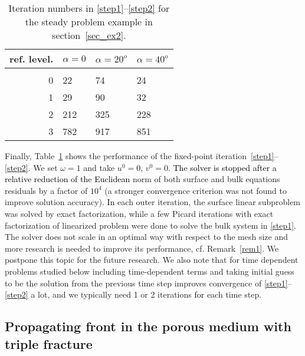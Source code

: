 \documentclass{article}
\newcommand{\rev}[1]{\textcolor{black}{{#1}}}
\begin{document}
\begin{table}[h!]   {
\begin{center}
\caption{Iteration numbers in \eqref{step1}--\eqref{step2} for the steady problem example in section~\ref{sec_ex2}.
\label{t_conv}}\smallskip
\small
\begin{tabular}{r|lll}\hline
ref. level. & $\alpha=0$ & $\alpha=20^o$ & $\alpha=40^o$ \\ \hline\\[-2ex]
0&	22   & 74  &24    \\
1&	29   & 90  &32    \\
2&	212  & 325 &228    \\
3& 782   & 917 &851   \\ \hline
\end{tabular}
\end{center}    }
\end{table}

{
Finally, Table~\ref{t_conv} shows the performance of the fixed-point iteration~\eqref{step1}--\eqref{step2}. We set $\omega=1$ and take $u^0=0$, $v^0=0$. \rev{The solver is stopped after a relative reduction of the Euclidean}  norm of  both surface and bulk equations residuals by a factor of $10^4$ (a stronger convergence criterion was not found to improve solution accuracy). \rev{In} each outer iteration, the surface linear subproblem was solved by exact factorization, while a few Picard iterations with exact factorization of linearized problem were done to solve the bulk system in \eqref{step1}.   The solver does not scale in an optimal way with respect to the mesh size and more research is needed to improve its performance, cf. Remark~\ref{rem1}. We postpone this topic for the future research. We also note that for time dependent problems studied  below including time-dependent terms and taking initial guess to be the solution from the previous time step improves convergence of \eqref{step1}--\eqref{step2} a lot,
and we typically need 1 or 2 iterations \rev{for} each time step.}


\subsection{Propagating front in the porous medium with triple fracture}

\hypersetup{pdfstartview=FitH, linkcolor=linkcolor,urlcolor=urlcolor, colorlinks=true}
\end{document}
